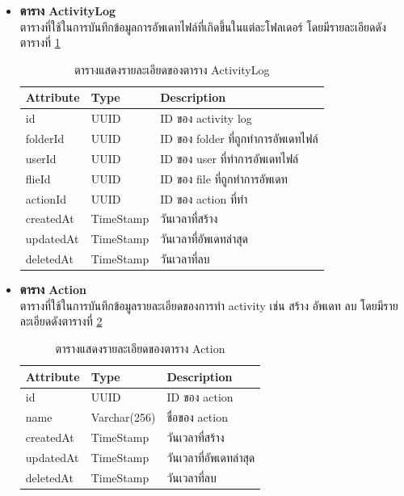 \documentclass[12pt,oneside,openright,a4paper]{cpe-thai-project}
\begin{document}
\begin{itemize}
\item \textbf{ตาราง ActivityLog}\\
ตารางที่ใช้ในการบันทึกข้อมูลการอัพเดทไฟล์ที่เกิดขึ้นในแต่ละโฟลเดอร์ โดยมีรายละเอียดดังตารางที่ \ref{tbl:dbActivityLog}
\begin{table}[!ht]
    \centering
    \begin{tabular}{|p{4cm}|p{2cm}|p{6cm}|}
    \hline
    \textbf{Attribute} & \textbf{Type} & \textbf{Description}   \\ \hline
    id        & UUID      & ID ของ activity log                 \\ \hline
    folderId  & UUID      & ID ของ folder ที่ถูกทำการอัพเดทไฟล์ \\ \hline
    userId    & UUID      & ID ของ user ที่ทำการอัพเดทไฟล์      \\ \hline
    flieId    & UUID      & ID ของ file ที่ถูกทำการอัพเดท       \\ \hline
    actionId  & UUID      & ID ของ action ที่ทำ                 \\ \hline
    createdAt & TimeStamp & วันเวลาที่สร้าง                     \\ \hline
    updatedAt & TimeStamp & วันเวลาที่อัพเดทล่าสุด              \\ \hline
    deletedAt & TimeStamp & วันเวลาที่ลบ                      \\ \hline
    \end{tabular}
    \caption{\centering  ตารางแสดงรายละเอียดของตาราง ActivityLog} \label{tbl:dbActivityLog}
\end{table}
\clearpage
\newpage
\item \textbf{ตาราง Action}\\
ตารางที่ใช้ในการบันทึกข้อมูลรายละเอียดของการทำ activity เช่น สร้าง อัพเดท ลบ โดยมีรายละเอียดดังตารางที่ \ref{tbl:dbAction}
\begin{table}[!ht]
    \centering
    \begin{tabular}{|p{4cm}|p{2cm}|p{6cm}|}
    \hline
    \textbf{Attribute} & \textbf{Type} & \textbf{Description}   \\ \hline
    id        & UUID        & ID ของ action          \\ \hline
    name      & Varchar(256) & ชื่อของ action         \\ \hline
    createdAt & TimeStamp   & วันเวลาที่สร้าง        \\ \hline
    updatedAt & TimeStamp   & วันเวลาที่อัพเดทล่าสุด \\ \hline
    deletedAt & TimeStamp   & วันเวลาที่ลบ          \\ \hline    
    \end{tabular}
    \caption{\centering  ตารางแสดงรายละเอียดของตาราง Action} \label{tbl:dbAction}
\end{table}


\end{itemize}
\end{document}
